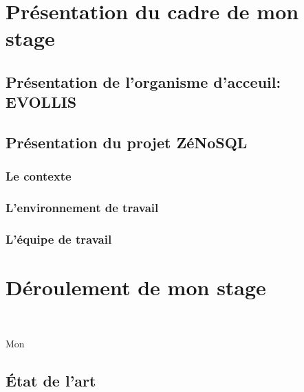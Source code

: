 




\begin{abstract}
  
\end{abstract}

\tableofcontents





\part{Présentation du cadre de mon stage}

\chapter{Présentation de l'organisme d'acceuil: {\sf EVOLLIS}}
\chapter{Présentation du projet \textsf{ZéNoSQL}}
\section{Le contexte}

\section{L'environnement de travail}
\section{L'équipe de travail}

\part{Déroulement de mon stage}

\newpage
~
\vspace{7cm}
\begin{center}
  \textsf{Mon} 
\end{center}
\newpage

\chapter{État de l'art}

